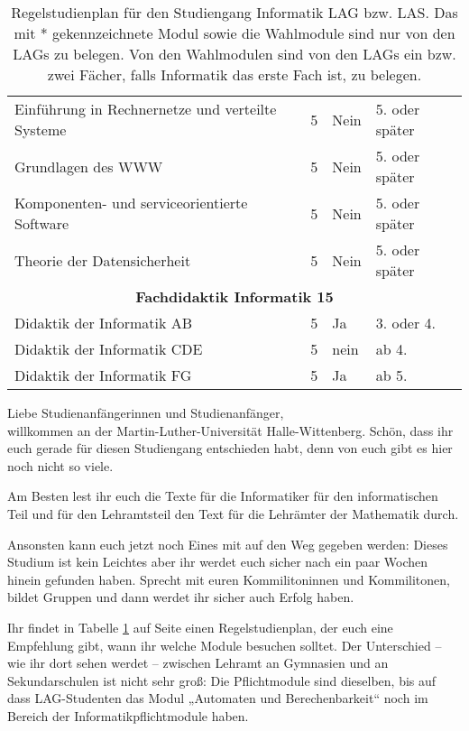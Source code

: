 \begin{table}[tbp]
\begin{footnotesize}
\begin{tabularx}{\textwidth}{|b{}|X|X|X|}
        Einführung in Rechnernetze und verteilte Systeme & 5 & Nein & 5. oder später \\
        Grundlagen des WWW                               & 5 & Nein & 5. oder später \\
        Komponenten- und serviceorientierte Software     & 5 & Nein & 5. oder später \\
        Theorie der Datensicherheit                      & 5 & Nein & 5. oder später \\
        \hline
        \multicolumn{4}{|c|}{\textbf{Fachdidaktik Informatik 15}}\\\hline
        Didaktik der Informatik AB  & 5 & Ja   & 3. oder 4. \\
        Didaktik der Informatik CDE & 5 & nein & ab 4. \\
        Didaktik der Informatik FG  & 5 & Ja   & ab 5. \\
        \hline
    \end{tabularx}
    \end{footnotesize}
    \caption{\label{plan-laI}Regelstudienplan für den Studiengang Informatik LAG bzw. LAS. Das mit * gekennzeichnete Modul sowie die Wahlmodule sind nur von den LAGs zu belegen. Von den Wahlmodulen sind von den LAGs ein bzw. zwei Fächer, falls Informatik das erste Fach ist, zu belegen.}
\end{table}

Liebe Studienanfängerinnen und Studienanfänger,\\
willkommen an der Martin-Luther-Universität Halle-Wittenberg.
Schön, dass ihr euch gerade für diesen Studiengang entschieden habt, denn von euch gibt es hier noch nicht so viele.

Am Besten lest ihr euch die Texte für die Informatiker für den informatischen Teil und für den Lehramtsteil den Text für die Lehrämter der Mathematik durch.

Ansonsten kann euch jetzt noch Eines mit auf den Weg gegeben werden:
Dieses Studium ist kein Leichtes aber ihr werdet euch sicher nach ein paar Wochen hinein gefunden haben.
Sprecht mit euren Kommilitoninnen und Kommilitonen, bildet Gruppen und dann werdet ihr sicher auch Erfolg haben.

Ihr findet in Tabelle \ref{plan-laI} auf Seite \pageref{plan-laI} einen Regelstudienplan, der euch eine Empfehlung gibt, wann ihr welche Module besuchen solltet.
Der Unterschied  -- wie ihr dort sehen werdet -- zwischen Lehramt an Gymnasien und an Sekundarschulen ist nicht sehr groß:
Die Pflichtmodule sind dieselben, bis auf dass LAG-Studenten das Modul „Automaten und Berechenbarkeit“ noch im Bereich der Informatikpflichtmodule haben.

